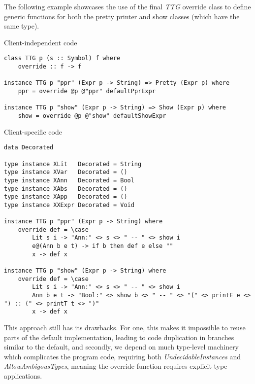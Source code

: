 \documentclass{article}
\begin{document}
The following example showcases the use of the final \emph{TTG} override class
to define generic functions for both the pretty printer and show classes (which
have the same type).

Client-independent code
\begin{lstlisting}
class TTG p (s :: Symbol) f where
    override :: f -> f

instance TTG p "ppr" (Expr p -> String) => Pretty (Expr p) where
    ppr = override @p @"ppr" defaultPprExpr

instance TTG p "show" (Expr p -> String) => Show (Expr p) where
    show = override @p @"show" defaultShowExpr
\end{lstlisting}

Client-specific code
\begin{lstlisting}
data Decorated

type instance XLit   Decorated = String
type instance XVar   Decorated = ()
type instance XAnn   Decorated = Bool
type instance XAbs   Decorated = ()
type instance XApp   Decorated = ()
type instance XXExpr Decorated = Void

instance TTG p "ppr" (Expr p -> String) where
    override def = \case
        Lit s i -> "Ann:" <> s <> " -- " <> show i
        e@(Ann b e t) -> if b then def e else ""
        x -> def x

instance TTG p "show" (Expr p -> String) where
    override def = \case
        Lit s i -> "Ann:" <> s <> " -- " <> show i
        Ann b e t -> "Bool:" <> show b <> " -- " <> "(" <> printE e <> ") :: (" <> printT t <> ")"
        x -> def x
\end{lstlisting}

This approach still has its drawbacks. For one, this makes it impossible to
reuse parts of the default implementation, leading to code duplication in
branches similar to the default, and secondly, we depend on much type-level
machinery which complicates the program code, requiring both
\emph{UndecidableInstances} and \emph{AllowAmbigousTypes}, meaning the override
function requires explicit type applications.

\end{document}
